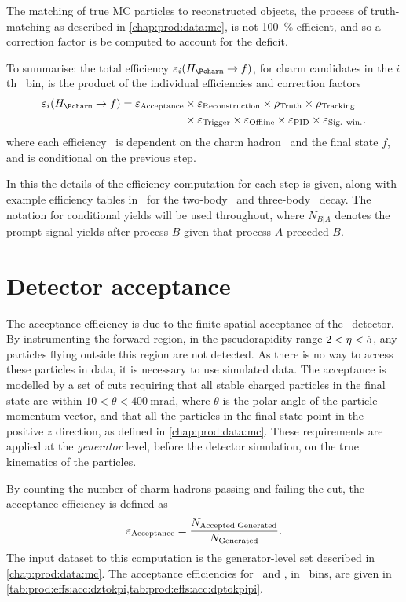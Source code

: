 The matching of true \ac{MC} particles to reconstructed objects, the process of 
truth-matching as described in \cref{chap:prod:data:mc}, is not \SI{100}{\%} 
efficient, and so a correction factor \efftruth is be computed to account for 
the deficit.

To summarise: the total efficiency $\eff_{i}(\decay{\PHc}{f})$, for charm 
candidates in the $i$th \pTy\ bin, is the product of the individual 
efficiencies and correction factors
\begin{align}
  \eff_{i}(\decay{\PHc}{f}) = \effacc &\times \effreco \times \efftruth \times \efftracking \nonumber\\
                                      &\times \efftrig \times \effoffline \times \effpid \times \effsigwin.
  \label{eqn:prod:effs:total_eff}
\end{align}
where each efficiency \eff\ is dependent on the charm hadron \PHc\ and the 
final state $f$, and is conditional on the previous step.

In this  the details of the efficiency computation for 
each step is given, along with example efficiency tables in \pTy\ for the 
two-body \DzToKpi\ and three-body \DpToKpipi\ decay.
The notation for conditional yields will be used throughout, where $N_{B|A}$ 
denotes the prompt signal yields after process $B$ given that process $A$ 
preceded $B$.

\section{Detector acceptance}
\label{chap:prod:effs:acc}

The acceptance efficiency is due to the finite spatial acceptance of the \lhcb\ 
detector.
By instrumenting the forward region, in the pseudorapidity range $2 < \eta < 
5$, any particles flying outside this region are not detected.
As there is no way to access these particles in data, it is necessary to use 
simulated data.
The acceptance is modelled by a set of cuts requiring that all stable charged 
particles in the final state are within $10 < \theta < 
\SI{400}{\milli\radian}$, where $\theta$ is the polar angle of the particle 
momentum vector, and that all the particles in the final state point in the 
positive $z$ direction, as defined in \cref{chap:prod:data:mc}.
These requirements are applied at the \emph{generator} level, before the 
detector simulation, on the true kinematics of the particles.

By counting the number of charm hadrons passing and failing the cut, the 
acceptance efficiency is defined as
\begin{equation}
  \effacc = \frac{%
    N_{\text{Accepted}|\text{Generated}}
  }
  {%
    N_{\text{\text{Generated}}}
  }.
  \label{eqn:prod:effs:acc}
\end{equation}
The input dataset to this computation is the generator-level set described in 
\cref{chap:prod:data:mc}.
The acceptance efficiencies for \DzToKpi\ and \DpToKpipi, in \pTy\ bins, are 
given in \cref{tab:prod:effs:acc:dztokpi,tab:prod:effs:acc:dptokpipi}.

